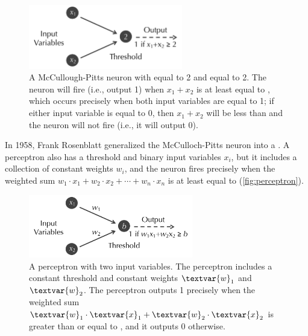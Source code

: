\begin{figure}[h]
\centering
\mySfFamily
\includegraphics[width = 0.6\textwidth]{../images/MP_neuron.png}
\caption{A McCullough-Pitts neuron with  equal to 2 and  equal to 2. The neuron will fire (i.e., output 1) when $x_1 + x_2$ is at least equal to , which occurs precisely when both input variables are equal to 1; if either input variable is equal to 0, then $x_1 + x_2$ will be less than  and the neuron will not fire (i.e., it will output 0).}
\label{fig:MP_neuron}
\end{figure}

In 1958, Frank Rosenblatt generalized the McCulloch-Pitts neuron into a . A perceptron also has a threshold  and  binary input variables $x_i$, but it includes a collection of constant weights $w_i$, and the neuron fires precisely when the weighted sum $w_1 \cdot x_1 + w_2 \cdot x_2 + \cdots + w_n \cdot x_n$ is at least equal to  (\autoref{fig:perceptron}).\\

\begin{note}\end{note}

\begin{figure}[h]
\centering
\mySfFamily
\includegraphics[width = 0.64\textwidth]{../images/perceptron.png}
\caption{A perceptron with two input variables. The perceptron includes a constant threshold and constant weights $\textvar{w}_\text{1}$ and $\textvar{w}_\text{2}$. The perceptron outputs 1 precisely when the weighted sum $\textvar{w}_\text{1} \cdot \textvar{x}_\text{1} + \textvar{w}_\text{2} \cdot \textvar{x}_\text{2}$ is greater than or equal to , and it outputs 0 otherwise.}
\label{fig:perceptron}
\end{figure}


